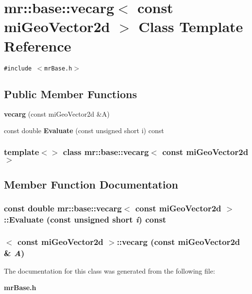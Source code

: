 \section{mr::base::vecarg$<$ const mi\-Geo\-Vector2d $>$ Class Template Reference}
\label{classmr_1_1base_1_1vecarg_3_01const_01miGeoVector2d_01_4}
{\tt \#include $<$mr\-Base.h$>$}

\subsection*{Public Member Functions}
\begin{CompactItemize}
\item 
{\bf vecarg} (const mi\-Geo\-Vector2d \&A)
\item 
const double {\bf Evaluate} (const unsigned short i) const 
\end{CompactItemize}
\subsubsection*{template$<$$>$ class mr::base::vecarg$<$ const mi\-Geo\-Vector2d $>$}



\subsection{Member Function Documentation}
\subsubsection{\setlength{\rightskip}{0pt plus 5cm}const double {\bf mr::base::vecarg}$<$ const mi\-Geo\-Vector2d $>$::Evaluate (const unsigned short {\em i}) const\hspace{0.3cm}{\tt  [inline]}}\label{classmr_1_1base_1_1vecarg_3_01const_01miGeoVector2d_01_4_a1}


\subsubsection{$<$ const mi\-Geo\-Vector2d $>$::{\bf vecarg} (const mi\-Geo\-Vector2d \& {\em A})\hspace{0.3cm}{\tt  [inline]}}\label{classmr_1_1base_1_1vecarg_3_01const_01miGeoVector2d_01_4_a0}




The documentation for this class was generated from the following file:\begin{CompactItemize}
\item 
{\bf mr\-Base.h}\end{CompactItemize}
